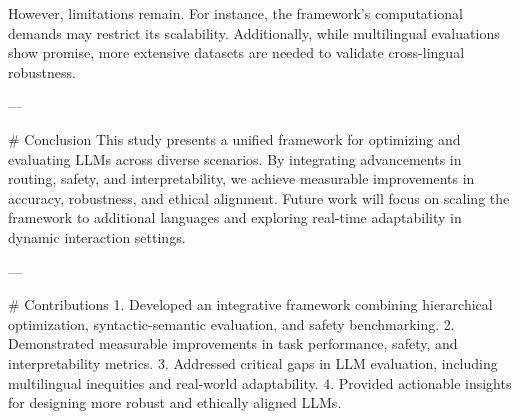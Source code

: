 However, limitations remain. For instance, the framework's computational demands may restrict its scalability. Additionally, while multilingual evaluations show promise, more extensive datasets are needed to validate cross-lingual robustness.

---

# Conclusion  
This study presents a unified framework for optimizing and evaluating LLMs across diverse scenarios. By integrating advancements in routing, safety, and interpretability, we achieve measurable improvements in accuracy, robustness, and ethical alignment. Future work will focus on scaling the framework to additional languages and exploring real-time adaptability in dynamic interaction settings.

---

# Contributions  
1. Developed an integrative framework combining hierarchical optimization, syntactic-semantic evaluation, and safety benchmarking.  
2. Demonstrated measurable improvements in task performance, safety, and interpretability metrics.  
3. Addressed critical gaps in LLM evaluation, including multilingual inequities and real-world adaptability.  
4. Provided actionable insights for designing more robust and ethically aligned LLMs.  